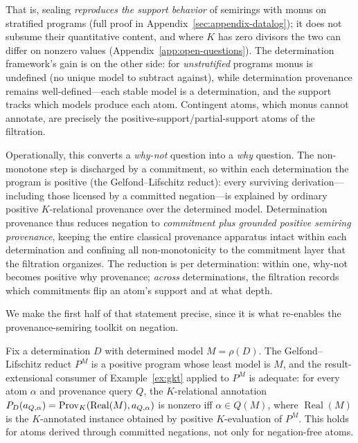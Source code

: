 \noindent
That is, sealing \emph{reproduces the support behavior} of semirings with
monus on stratified programs (full proof in
Appendix~\ref{sec:appendix-datalog}); it does not subsume their quantitative
content, and where $K$ has zero divisors the two can differ on nonzero values
(Appendix~\ref{app:open-questions}). The determination framework's gain is on
the other side: for \emph{unstratified} programs monus is undefined (no unique
model to subtract against), while determination provenance remains
well-defined---each stable model is a determination, and the support tracks
which models produce each atom. Contingent atoms, which monus cannot annotate,
are precisely the positive-support/partial-support atoms of the filtration.

Operationally, this converts a \emph{why-not} question into a \emph{why}
question. The non-monotone step is discharged by a commitment, so within each
determination the program is positive (the Gelfond--Lifschitz reduct): every
surviving derivation---including those licensed by a committed negation---is
explained by ordinary positive $K$-relational provenance over the determined
model. Determination provenance thus reduces negation to \emph{commitment plus
grounded positive semiring provenance}, keeping the entire classical
provenance apparatus intact within each determination and confining all
non-monotonicity to the commitment layer that the filtration organizes. The
reduction is per determination: within one, why-not becomes positive why
provenance; \emph{across} determinations, the filtration records which
commitments flip an atom's support and at what depth.

We make the first half of that statement precise, since it is what re-enables
the provenance-semiring toolkit on negation.

\begin{proposition}
  \label{prop:kprov-negation}
  Fix a determination $D$ with determined model $M = \rho(D)$. The
  Gelfond--Lifschitz reduct $P^{M}$ is a positive program whose least model is
  $M$, and the result-extensional consumer of Example~\ref{ex:gkt} applied to
  $P^{M}$ is adequate: for every atom $\alpha$ and provenance query $Q$, the
  $K$-relational annotation $P_D(a_{Q,\alpha}) = \operatorname{Prov}_K(\operatorname{Real}(M),
  a_{Q,\alpha})$ is nonzero iff $\alpha \in Q(M)$, where $\operatorname{Real}(M)$
  is the $K$-annotated instance obtained by positive $K$-evaluation of $P^{M}$.
  This holds for atoms derived through committed negations, not only for
  negation-free atoms.
\end{proposition}

